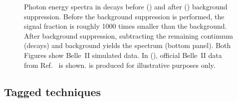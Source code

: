 \begin{figure}[hbtp!]
    \centering
    \caption{\label{fig:untagged_btosgamma}
    Photon energy spectra in \BtoXsgamma decays before () and after () background suppression.
    Before the background suppression is performed, the signal fraction is roughly 1000 times smaller than the background.
    After background suppression, subtracting the remaining continuum (\epem\ra\qqbar decays) and \BB background yields the \BtoXsgamma spectrum (bottom panel).
    Both Figures show Belle~II simulated data.
    In (), official Belle~II data from Ref.~\cite{Collaboration:2302} is shown.
     is produced for illustrative purposes only. 
    }
\end{figure}

\subsection{Tagged techniques}\label{sec:had_tagged_overview}


